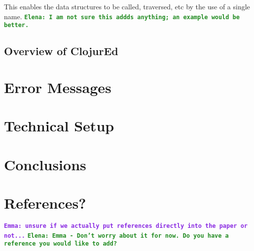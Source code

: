 \documentclass[12pt]{article}
\newcommand{\comment}[1]{{\bf \tt  {#1}}}
\newcommand{\emcomment}[1]{\textcolor{ForestGreen}{\comment{Elena: {#1}}}}
\newcommand{\escomment}[1]{\textcolor{BlueViolet}{\comment{Emma: {#1}}}}
\begin{document}
This enables the data structures to be called, traversed, etc by the
use of a single name. \emcomment{I am not sure this addds anything; an
example would be better.}

\subsection{Overview of ClojurEd}\label{sec:project}

\section{Error Messages}\label{sec:errors}

\section{Technical Setup}\label{sec:technical}

\section{Conclusions}\label{sec:conclusion}

\section{References?}\label{sec:reference}
\escomment{unsure if we actually put references directly into the
  paper or not...}
\emcomment{Emma - Don't worry about it for now. Do you have a reference you
  would like to add?}

\end{document}
